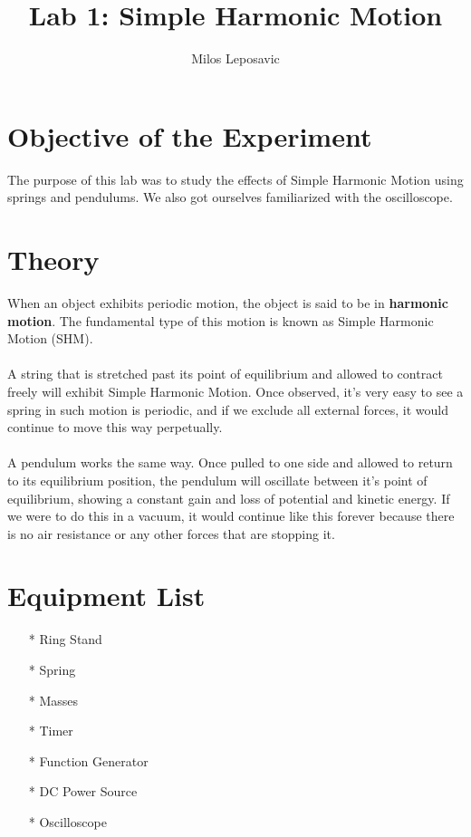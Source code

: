 \documentclass[titlepage]{article}
\title{Lab 1: Simple Harmonic Motion}
\author{Milos Leposavic}
\begin{document}
\maketitle

\section{Objective of the Experiment}\label{sec:obj}
The purpose of this lab was to study the effects of Simple Harmonic Motion using springs and pendulums. We also got ourselves familiarized with the oscilloscope.

\section{Theory}\label{sec:theory}
When an object exhibits periodic motion, the object is said to be in \textbf{harmonic motion}. The fundamental type of this motion is known as Simple Harmonic Motion (SHM).\\
\\
A string that is stretched past its point of equilibrium and allowed to contract freely will exhibit Simple Harmonic Motion. Once observed, it's very easy to see a spring in such motion is periodic, and if we exclude all external forces, it would continue to move this way perpetually.\\
\\
A pendulum works the same way. Once pulled to one side and allowed to return to its equilibrium position, the pendulum will oscillate between it's point of equilibrium, showing a constant gain and loss of potential and kinetic energy. If we were to do this  in a vacuum, it would continue like this forever because there is no air resistance or any other forces that are stopping it.

\section{Equipment List}\label{sec:equipment_list}
\begin{itemize}
\item[*] Ring Stand
\item[*] Spring
\item[*] Masses
\item[*] Timer
\item[*] Function Generator
\item[*] DC Power Source
\item[*] Oscilloscope
\end{itemize}
\end{document}
